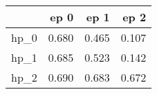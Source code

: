 \begin{tabular}{lrrr}
\toprule
{} &   ep 0 &   ep 1 &   ep 2 \\
\midrule
hp\_0 &  0.680 &  0.465 &  0.107 \\
hp\_1 &  0.685 &  0.523 &  0.142 \\
hp\_2 &  0.690 &  0.683 &  0.672 \\
\bottomrule
\end{tabular}
